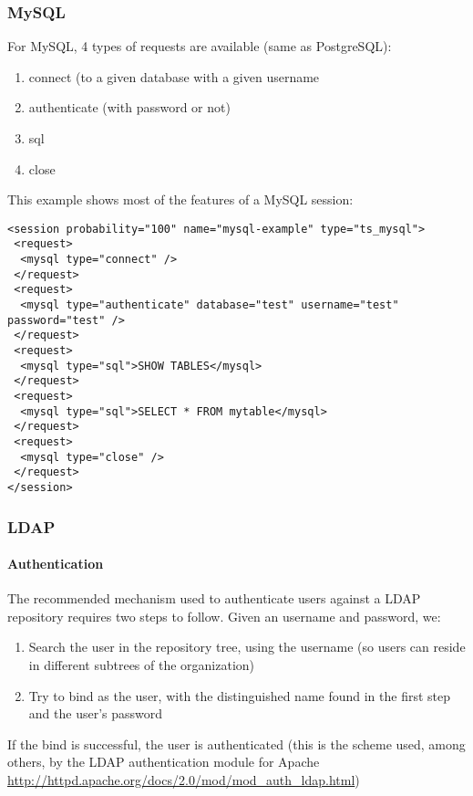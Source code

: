 \documentclass{TSUNG-en}
\begin{document}
\subsubsection{MySQL}
\label{sec:session:mysql}
For MySQL, 4 types of requests are available (same as PostgreSQL):
\begin{enumerate}
\item connect (to a given database with a given username
\item authenticate (with password or not)
\item sql
\item close
\end{enumerate}

This example shows most of the features of a MySQL session:

\begin{Verbatim}
<session probability="100" name="mysql-example" type="ts_mysql">
 <request>
  <mysql type="connect" />
 </request>
 <request>
  <mysql type="authenticate" database="test" username="test" password="test" />
 </request>
 <request>
  <mysql type="sql">SHOW TABLES</mysql>
 </request>
 <request>
  <mysql type="sql">SELECT * FROM mytable</mysql>
 </request>
 <request>
  <mysql type="close" />
 </request>
</session>
\end{Verbatim}

\subsubsection{LDAP}
\label{sec:session:ldap}

\paragraph{Authentication}
The recommended mechanism used to authenticate users against a LDAP
repository requires two steps to follow. Given an username and
password, we:

\begin{enumerate}
\item Search the user in the repository tree, using the username (so users can reside in different subtrees of the organization)
\item Try to bind as the user, with the distinguished name found in the first step and the user's password
\end{enumerate}

If the bind is successful, the user is authenticated (this is the
scheme used, among others, by the LDAP authentication module for
Apache \url{http://httpd.apache.org/docs/2.0/mod/mod_auth_ldap.html})
\end{document}
